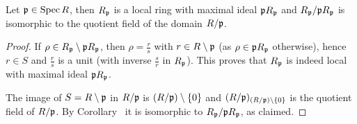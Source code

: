 \documentclass[a4paper,parskip=half,numbers=enddot, DIV=12]{scrreprt}
\begin{document}
	\begin{prop}
		Let $\mathfrak{p}\in \operatorname{Spec} R$, then $R_{\mathfrak{p}}$ is a local ring with maximal ideal $\mathfrak{p} R_{\mathfrak{p}}$ and $R_{\mathfrak{p}}/\mathfrak{p} R_{\mathfrak{p}}$ is isomorphic to the quotient field of the domain $R/\mathfrak{p}$.
	\end{prop}
	\begin{proof}
		If $\rho\in R_{\mathfrak{p}}\setminus\mathfrak{p} R_{\mathfrak{p}}$, then $\rho=\frac rs$ with $r\in R\setminus \mathfrak{p}$ (as $\rho\in\mathfrak{p} R_{\mathfrak{p}}$ otherwise), hence $r\in S$ and $\frac rs$ is a unit (with inverse $\frac sr$ in $R_{\mathfrak{p}}$). This proves that $R_{\mathfrak{p}}$ is indeed local with maximal ideal $\mathfrak{p} R_{\mathfrak{p}}$.
		
		The image of $S=R\setminus \mathfrak{p}$ in $R/\mathfrak{p}$ is $(R/\mathfrak{p})\setminus\{0\}$ and $(R/\mathfrak{p})_{(R/\mathfrak{p})\setminus\{0\}}$ is the quotient field of $R/\mathfrak{p}$. By Corollary~ it is isomorphic to $R_{\mathfrak{p}}/\mathfrak{p} R_{\mathfrak{p}}$, as claimed.
	\end{proof}
\end{document}
